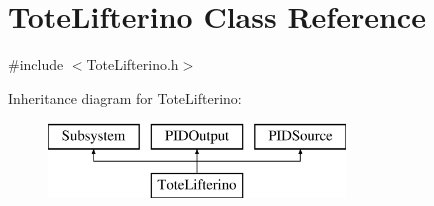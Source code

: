 \hypertarget{class_tote_lifterino}{}\section{Tote\+Lifterino Class Reference}
\label{class_tote_lifterino}


{\ttfamily \#include $<$Tote\+Lifterino.\+h$>$}

Inheritance diagram for Tote\+Lifterino\+:\begin{figure}[H]
\begin{center}
\leavevmode
\includegraphics[height=2.000000cm]{class_tote_lifterino}
\end{center}
\end{figure}
